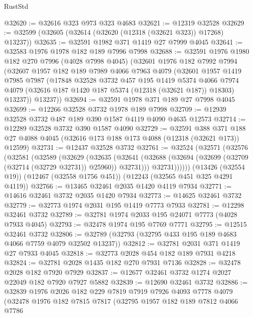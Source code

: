\begin{lexlean}{RustStd}
\begin{coremodule}
@32620 := @32616 @323 @973 @323 @4683
@32621 := @12319 @32528
@32629 := @32599 (@32605 (@32614 (@32620 (@12318 (@32621 @323)) @17268) @13237))
@32635 := @32591 @1982 @371 @1419 @27 @7999 @4045
@32641 := @32583 @1976 @1978 @182 @189 @7996 @7998
@32688 := @32591
    @1976
    @1980
    @182
    @270
    @7996
    (@4028 @7998 @4045)
    (@32601
      @1976
      @182
      @7992
      @7994
      (@32607
        @1957
        @182
        @189
        @7989
        @4066
        @7963
        @4079
        (@32601
          @1957
          @1419
          @7985
          @7987
          (@17848
            @32528
            @3732
            @457
            @195
            @1419
            @5374
            @4066
            @7974
            @4079
            (@32616 @187 @1420 @187 @5374 (@12318 (@32621 @187)) @18303)
            @13237))
        @13237))
@32694 := @32591 @1978 @371 @189 @27 @7998 @4045
@32699 := @12266 @32528 @3732 @1978 @189 @7998
@32709 := @12939 @32528 @3732 @487 @189 @390 @1587 @4119 @4090 @4635 @12573
@32714 := @12289 @32528 @3732 @390 @1587 @4090
@32729 := @32591
    @388
    @371
    @188
    @27
    @4088
    @4045
    (@32616 @173 @188 @173 @4088 (@12318 (@32621 @173)) @12599)
@32731 := @12437 @32528 @3732
@32761 := @32524
    (@32571
      (@32576
        (@32581
          (@32589
            (@32629
              (@32635
                (@32641 (@32688 (@32694 (@32699 (@32709 (@32714 (@32729 @32731)) @25960)) @32731)))
                @32731))))))
    (@13426 (@32554 @19))
    (@12467 (@32558 @1756 @451))
    (@12243 (@32565 @451 @325 @4291 @4119))
@32766 := @13465 @32461 @2035 @1420 @4119 @7934
@32771 := @14616 @32461 @3732 @2035 @1420 @7934
@32773 := @14625 @32461 @3732
@32779 := @32773 @1974 @2031 @195 @1419 @7773 @7933
@32781 := @12298 @32461 @3732
@32789 := @32781 @1974 @2033 @195 @24071 @7773 (@4028 @7933 @4045)
@32793 := @32478 @1974 @195 @7769 @7771
@32795 := @12515 @32461 @3732
@32806 := @32789 (@32793 (@32795 @433 @195 @189 @4683 @4066 @7759 @4079 @32502 @13237))
@32812 := @32781 @2031 @371 @1419 @27 @7933 @4045
@32818 := @32773 @2028 @454 @182 @189 @7931 @4218
@32824 := @32781 @2028 @1435 @182 @270 @7931 @7136
@32828 := @32478 @2028 @182 @7920 @7929
@32837 := @12677 @32461 @3732 @1274 @2027 @22049 @182 @7920 @7927 @5882
@32839 := @12690 @32461 @3732
@32886 := @32839
    @1976
    @2026
    @182
    @229
    @7819
    @7919
    @7926
    @4093
    @7778
    @4079
    (@32478
      @1976
      @182
      @7815
      @7817
      (@32795
        @1957
        @182
        @189
        @7812
        @4066
        @7786

\end{coremodule}
\end{lexlean}
